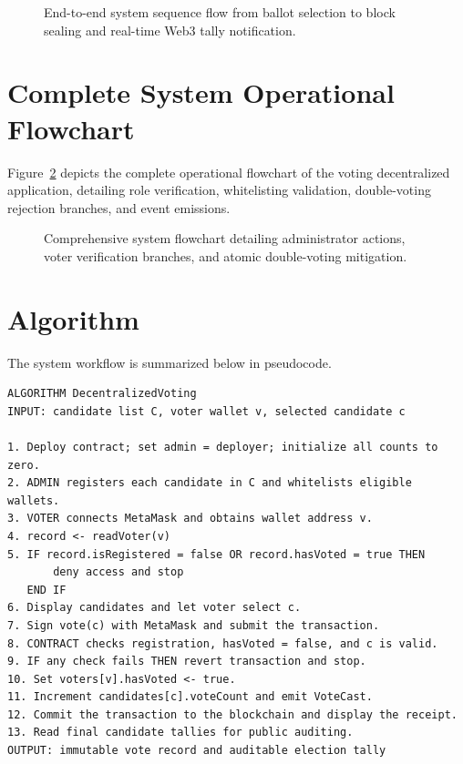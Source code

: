 \documentclass[12pt,a4paper]{report}
\begin{document}
\begin{figure}[H]
\centering
{}
\caption{End-to-end system sequence flow from ballot selection to block sealing and real-time Web3 tally notification.}
\label{fig:end_to_end_flow}
\end{figure}

\section{Complete System Operational Flowchart}
Figure~\ref{fig:sys_flowchart} depicts the complete operational flowchart of the voting decentralized application, detailing role verification, whitelisting validation, double-voting rejection branches, and event emissions.

\begin{figure}[H]
\centering
{}
\caption{Comprehensive system flowchart detailing administrator actions, voter verification branches, and atomic double-voting mitigation.}
\label{fig:sys_flowchart}
\end{figure}

\clearpage
\section{Algorithm}
The system workflow is summarized below in pseudocode.

\begin{verbatim}
ALGORITHM DecentralizedVoting
INPUT: candidate list C, voter wallet v, selected candidate c

1. Deploy contract; set admin = deployer; initialize all counts to zero.
2. ADMIN registers each candidate in C and whitelists eligible wallets.
3. VOTER connects MetaMask and obtains wallet address v.
4. record <- readVoter(v)
5. IF record.isRegistered = false OR record.hasVoted = true THEN
       deny access and stop
   END IF
6. Display candidates and let voter select c.
7. Sign vote(c) with MetaMask and submit the transaction.
8. CONTRACT checks registration, hasVoted = false, and c is valid.
9. IF any check fails THEN revert transaction and stop.
10. Set voters[v].hasVoted <- true.
11. Increment candidates[c].voteCount and emit VoteCast.
12. Commit the transaction to the blockchain and display the receipt.
13. Read final candidate tallies for public auditing.
OUTPUT: immutable vote record and auditable election tally
\end{verbatim}
\end{document}
